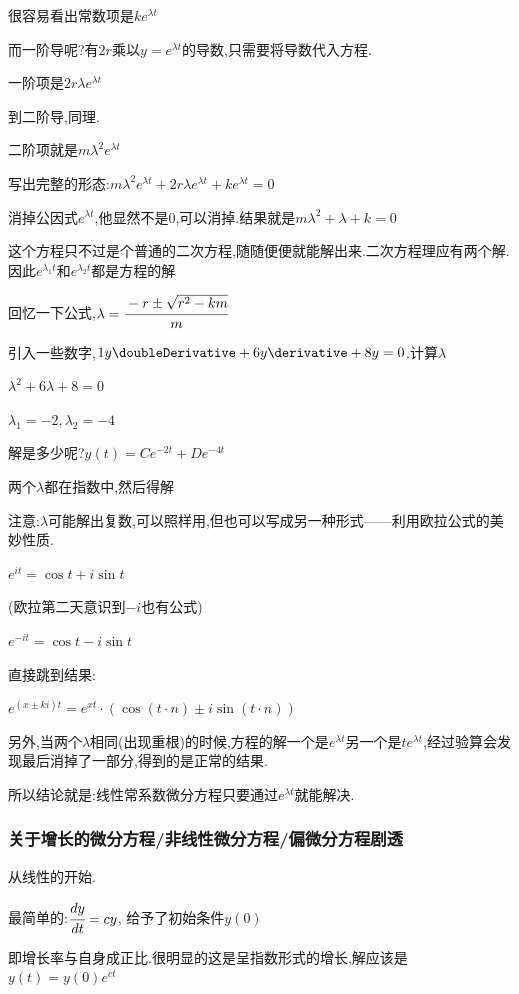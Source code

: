{{{很容易看出常数项是$ke^{\lambda t}$

而一阶导呢?有$2r$乘以$y = e^{\lambda t}$的导数,只需要将导数代入方程.

一阶项是$2r\lambda e^{\lambda t}$

到二阶导,同理.

二阶项就是$m\lambda^2e^{\lambda t}$

写出完整的形态:$m\lambda^2e^{\lambda t} + 2r\lambda e^{\lambda t} + ke^{\lambda t} = 0$

消掉公因式$e^{\lambda t}$,他显然不是0,可以消掉.结果就是$m\lambda^2 + \lambda + k= 0$

这个方程只不过是个普通的二次方程,随随便便就能解出来.二次方程理应有两个解.因此$e^{\lambda_1 t}$和$e^{\lambda_2 t}$都是方程的解

回忆一下公式,$\lambda = \cfrac{-r \pm \sqrt{r^2 - km}}{m}$

引入一些数字,$1y\doubleDerivative + 6y\derivative + 8y = 0$.计算$\lambda$

$\lambda^2 + 6\lambda + 8 = 0$

$\lambda_1 = -2, \lambda_2 = -4$

解是多少呢?$y(t) = Ce^{-2t} + De^{-4t}$

两个$\lambda$都在指数中,然后得解

注意:$\lambda$可能解出复数,可以照样用,但也可以写成另一种形式——利用欧拉公式的美妙性质.

$e^{it} = \cos t + i\sin t$

(欧拉第二天意识到$-i$也有公式)

$e^{-it} = \cos t -i\sin t$

直接跳到结果:

$e^{(x \pm ki)t} = e^{xt}\cdot(\cos(t\cdot n) \pm i\sin(t\cdot n))$

另外,当两个$\lambda$相同(出现重根)的时候,方程的解一个是$e^{\lambda t}$另一个是$te^{\lambda t}$,经过验算会发现最后消掉了一部分,得到的是正常的结果.

所以结论就是:线性常系数微分方程只要通过$e^{\lambda t}$就能解决.
}%

\subsubsection{关于增长的微分方程/非线性微分方程/偏微分方程剧透}{
  从线性的开始.

  最简单的:$\cfrac{dy}{dt} = cy$, 给予了初始条件$y(0)$

  即增长率与自身成正比.很明显的这是呈指数形式的增长,解应该是$y(t) = y(0)e^{ct}$

}}}
